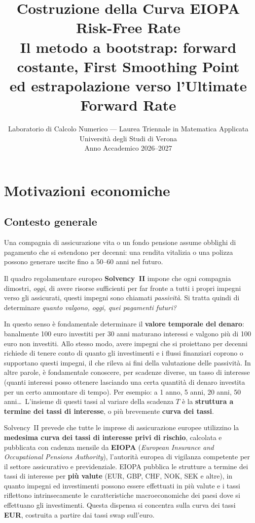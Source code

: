 \documentclass[11pt,a4paper]{article}
\title{%
  \textbf{Costruzione della Curva EIOPA Risk-Free Rate}\\[6pt]
  \large Il metodo a bootstrap: forward costante, First Smoothing Point\\[3pt]
  ed estrapolazione verso l'Ultimate Forward Rate\\[4pt]
}
\author{Laboratorio di Calcolo Numerico --- Laurea Triennale in Matematica Applicata\\
  Universit\`a degli Studi di Verona\\[2pt]
  Anno Accademico 2026--2027}
\date{}
\theoremstyle{plain}
\theoremstyle{definition}
\theoremstyle{remark}
\begin{document}
\maketitle
\tableofcontents
\newpage

\section{Motivazioni economiche}

\subsection{Contesto generale}

Una compagnia di assicurazione vita o un fondo pensione assume obblighi di pagamento che si
estendono per decenni: una rendita vitalizia o una polizza possono generare uscite fino a
50--60 anni nel futuro.

Il quadro regolamentare europeo \textbf{Solvency~II} impone che ogni compagnia dimostri,
\emph{oggi}, di avere risorse sufficienti per far fronte a tutti i propri impegni verso gli
assicurati, questi impegni sono chiamati \emph{passivit\`a}. Si tratta quindi di determinare \emph{quanto
valgono, oggi, quei pagamenti futuri?}

In questo senso è fondamentale determinare il \textbf{valore temporale del denaro}: banalmente 100 euro investiti per 30 anni maturano interessi e valgono più di 100 euro non investiti.
Allo stesso modo, avere impegni che si proiettano per decenni richiede di tenere conto di quanto gli investimenti e i flussi finanziari
coprono o supportano questi impegni, il che rileva ai fini della valutazione delle passivit\`a. In altre parole,
è fondamentale conoscere, per scadenze diverse, un tasso di interesse (quanti interessi posso ottenere lasciando una certa quantità di denaro investita per un certo ammontare di tempo).
Per esempio: a 1 anno, 5 anni, 20 anni, 50
anni\ldots\ L'insieme di questi tassi al variare della scadenza $T$ \`e la \textbf{struttura a
termine dei tassi di interesse}, o pi\`u brevemente \textbf{curva dei tassi}.

Solvency~II prevede che tutte le imprese di assicurazione europee utilizzino la \textbf{medesima
curva dei tassi di interesse privi di rischio}, calcolata e pubblicata con cadenza mensile da
\textbf{EIOPA} (\emph{European Insurance and Occupational Pensions Authority}), l'autorit\`a
europea di vigilanza competente per il settore assicurativo e previdenziale. EIOPA pubblica le
strutture a termine dei tassi di interesse per \textbf{pi\`u valute} (EUR, GBP, CHF, NOK, SEK e
altre), in quanto impegni ed investimenti possono essere effettuati in più valute e i tassi riflettono intrinsecamente le caratteristiche macroeconomiche dei paesi dove si effettuano gli investimenti.
 Questa dispensa si concentra sulla curva dei tassi \textbf{EUR}, costruita a partire dai
tassi swap sull'euro. 
\end{document}
